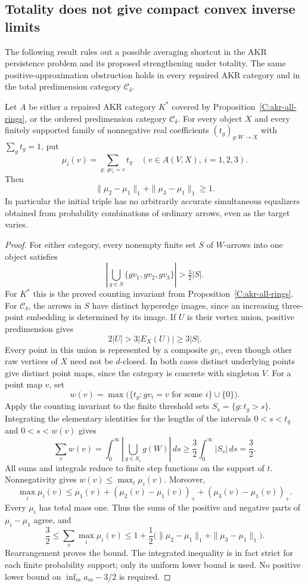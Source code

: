 \subsection{Totality does not give compact convex inverse limits}

The following result rules out a possible averaging shortcut in the
AKR persistence problem and its proposed strengthening under
totality. The same positive-approximation obstruction holds in
every repaired AKR category and in the total predimension category
$\mathcal C_\delta$.

\begin{proposition}
\label{CC:positive-gap}
Let $A$ be either a repaired AKR category $K^*$ covered by
Proposition~\ref{C:akr-all-rings}, or the ordered predimension
category $\mathcal C_\delta$. For every object $X$ and every
finitely supported family of nonnegative real coefficients
$(t_g)_{g:W\to X}$ with $\sum_g t_g=1$, put
\[
 \mu_i(v)=\sum_{g:\,gv_i=v}t_g\quad
(v\in A(V,X),\ i=1,2,3).
\]
Then
\[
 \|\mu_2-\mu_1\|_1+\|\mu_3-\mu_1\|_1\geq1.
\]
In particular the initial triple has no arbitrarily accurate
simultaneous equalizers obtained from probability combinations of
ordinary arrows, even as the target varies.
\end{proposition}
\begin{proof}
For either category, every nonempty finite set $S$ of $W$-arrows
into one object satisfies
\[
 \left|\bigcup_{g\in S}\{gv_1,gv_2,gv_3\}\right|>\tfrac32|S|.
\]
For $K^*$ this is the proved counting invariant from
Proposition~\ref{C:akr-all-rings}. For $\mathcal C_\delta$, the
arrows in $S$ have distinct hyperedge images, since an increasing
three-point embedding is determined by its image. If $U$ is
their vertex union, positive predimension gives
\[
 2|U|>3|E_X(U)|\geq3|S|.
\]
Every point in this union is represented by a composite $gv_i$,
even though other raw vertices of $X$ need not be $d$-closed.
In both cases distinct underlying points give distinct point maps,
since the category is concrete with singleton $V$.
For a point map $v$, set
\[
 w(v)=\max\bigl(\{t_g:gv_i=v\text{ for some }i\}\cup\{0\}\bigr).
\]
Apply the counting invariant to the finite threshold sets
$S_s=\{g:t_g>s\}$. Integrating the elementary identities for the
lengths of the intervals $0<s<t_g$ and $0<s<w(v)$ gives
\[
 \sum_v w(v)
 =\int_0^\infty\left|\bigcup_{g\in S_s}g(W)\right|\,ds
 \geq\frac32\int_0^\infty|S_s|\,ds
 =\frac32.
\]
All sums and integrals reduce to finite step functions on the support
of $t$. Nonnegativity gives
$w(v)\leq\max_i\mu_i(v)$. Moreover,
\[
 \max_i\mu_i(v)\leq
 \mu_1(v)+(\mu_2(v)-\mu_1(v))_+
              +(\mu_3(v)-\mu_1(v))_+.
\]
Every $\mu_i$ has total mass one. Thus the sums of the positive and
negative parts of $\mu_i-\mu_1$ agree, and
\[
 \frac32\leq\sum_v\max_i\mu_i(v)
 \leq1+\frac12\bigl(
 \|\mu_2-\mu_1\|_1+\|\mu_3-\mu_1\|_1\bigr).
\]
Rearrangement proves the bound. The integrated inequality is in
fact strict for each finite probability support; only its uniform
lower bound is used. No positive lower bound on
$\inf_m a_m-3/2$ is required.
\end{proof}

